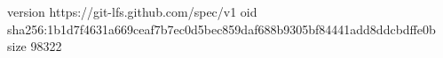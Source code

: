 version https://git-lfs.github.com/spec/v1
oid sha256:1b1d7f4631a669ceaf7b7ec0d5bec859daf688b9305bf84441add8ddcbdffe0b
size 98322
